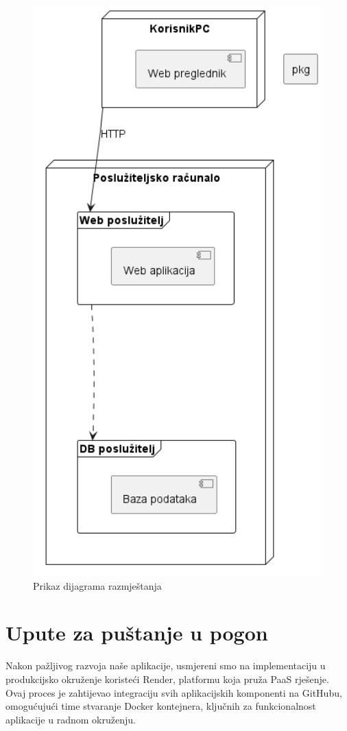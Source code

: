 		\begin{figure} [H]
			\centering
			\includegraphics[width=0.7\linewidth]{dijagrami/dijagramRazmjestanja.png}
			\caption{Prikaz dijagrama razmještanja}
			\label{fig:Prikaz dijagrama razmještanja}
		\end{figure}

			\eject 
		
		\section{Upute za puštanje u pogon}


		Nakon pažljivog razvoja naše aplikacije, usmjereni smo na implementaciju u produkcijsko okruženje koristeći Render, platformu koja pruža PaaS rješenje. Ovaj proces je zahtijevao integraciju svih aplikacijskih komponenti na GitHubu, omogućujući time stvaranje Docker kontejnera, ključnih za funkcionalnost aplikacije u radnom okruženju.

